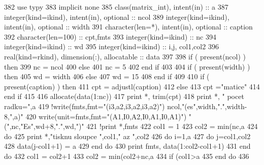 \begin{DoxyCode}
382     \textcolor{keywordtype}{use }typy
383     \textcolor{keywordtype}{implicit none}
385     \textcolor{keywordtype}{class}(matrix\_int), \textcolor{keywordtype}{intent(in)} :: a
387     \textcolor{keywordtype}{integer(kind=ikind)}, \textcolor{keywordtype}{intent(in)}, \textcolor{keywordtype}{optional} :: ncol
389     \textcolor{keywordtype}{integer(kind=ikind)}, \textcolor{keywordtype}{intent(in)}, \textcolor{keywordtype}{optional} :: width
391     \textcolor{keywordtype}{character(len=*)}, \textcolor{keywordtype}{intent(in)},    \textcolor{keywordtype}{optional} :: caption
392     \textcolor{keywordtype}{character(len=100)} :: cpt,fmts
393     \textcolor{keywordtype}{integer(kind=ikind)} :: nc
394     \textcolor{keywordtype}{integer(kind=ikind)} :: wd
395     \textcolor{keywordtype}{integer(kind=ikind)} :: i,j, col1,col2
396     \textcolor{keywordtype}{real(kind=rkind)}, \textcolor{keywordtype}{dimension(:)}, \textcolor{keywordtype}{allocatable} :: data
397 
398     \textcolor{keywordflow}{if} ( \textcolor{keyword}{present}(ncol) ) then
399         nc = ncol
400     else
401         nc = 5
402 \textcolor{keyword}{    end }if
403 
404     \textcolor{keywordflow}{if} ( \textcolor{keyword}{present}(width) ) then
405         wd = width
406     else
407         wd = 15
408 \textcolor{keyword}{    end }if
409 
410     \textcolor{keywordflow}{if} ( \textcolor{keyword}{present}(caption) ) then
411         cpt = adjustl(caption)
412     else
413         cpt =\textcolor{stringliteral}{"matice"}
414 \textcolor{keyword}{    end }if
415 
416     \textcolor{keyword}{allocate}(\textcolor{keyword}{data}(1:nc))
417     print *, trim(cpt)
418     print *, \textcolor{stringliteral}{" pocet radku="},a%
419     \textcolor{comment}{!write(fmts,fmt="(i3,a2,i3,a2,i3,a2)") ncol,"(es",width,".",width-8,",a)"
}
420     \textcolor{keyword}{write}(unit=fmts,fmt=\textcolor{stringliteral}{"(A1,I0,A2,I0,A1,I0,A1)"})   \textcolor{stringliteral}{"("},nc,\textcolor{stringliteral}{"Es"},wd+8,\textcolor{stringliteral}{"."},wd,\textcolor{stringliteral}{")"}
421     \textcolor{comment}{!print *,fmts
}
422     col1 = 1
423     col2 = min(nc,a%
424     do
425         print *,\textcolor{stringliteral}{"tisknu sloupce "},col1,\textcolor{stringliteral}{" az "},col2
426         \textcolor{keywordflow}{do} i=1,a%
427             \textcolor{keywordflow}{do} j=col1,col2
428                 \textcolor{keyword}{data}(j-col1+1) = a%
429 \textcolor{keyword}{            end }do
430             print fmts, \textcolor{keyword}{data}(1:col2-col1+1)
431 \textcolor{keyword}{        end }do
432         col1 = col2+1
433         col2 = min(col2+nc,a%
434         \textcolor{keywordflow}{if} (col1>a%
435 \textcolor{keyword}{    end }do
436 
\end{DoxyCode}
